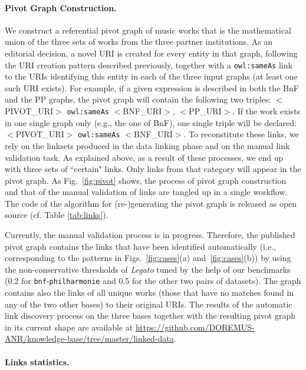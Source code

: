 \vspace{-0.8cm}

\paragraph{Pivot Graph Construction.}
We construct a referential pivot graph of music works that is the mathematical union of the three sets of works from the three partner institutions. As an editorial decision, a novel URI is created for every entity in that graph, following the URI creation pattern described previously, together with a {\tt owl:sameAs} link to the URIs identifying this entity in each of the three input graphs (at least one such URI exists). For example, if a given expression is described in both the BnF and the PP graphs, the pivot graph will contain the following two triples: 
$<$PIVOT\_URI$>$ {\tt owl:sameAs} $<$BNF\_URI$>$, $<$PP\_URI$>$. If the work exists  in one single graph only (e.g., the  one of BnF), one single triple will be declared: $<$PIVOT\_URI$>$ {\tt owl:sameAs} $<$BNF\_URI$>$. To reconstitute these links, we rely on the linksets produced in the data linking phase and on the manual link validation task. As explained above, as a result of these processes, we end up with three sets of ``certain" links. Only links from that category will appear in the pivot graph. As Fig.~\ref{fig:pivot} shows, the process of pivot graph construction and that of the manual validation of links are tangled up in a single workflow. The code of the algorithm for (re-)generating the pivot graph is released as open source (cf. Table \ref{tab:links}).

Currently, the manual validation process is in progress. Therefore, the published pivot graph contains the links that have been identified automatically (i.e., corresponding to the patterns in Figs.~\ref{fig:cases}(a) and~\ref{fig:cases}(b)) by using the non-conservative thresholds of {\it Legato} tuned by the help of our benchmarks (0.2 for {\tt bnf}-{\tt philharmonie} and 0.5 for the other two pairs of datasets). The graph contains also the links of all unique works (those that have no matches found in any of the two other bases) to their original URIs. The results of the automatic link discovery process on the three bases together with the resulting pivot graph in its current shape are available at \url{https://github.com/DOREMUS-ANR/knowledge-base/tree/master/linked-data}. 

\paragraph{Links statistics.}

